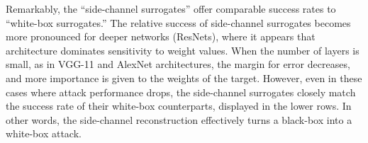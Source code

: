 \documentclass[12pt]{report}
\begin{document}
Remarkably, the ``side-channel surrogates'' offer comparable
success rates to
``white-box surrogates.'' 
The relative success of side-channel surrogates becomes more pronounced for deeper networks (ResNets), where it appears that architecture dominates sensitivity to weight values.
When the number of layers is small, as in VGG-11 and AlexNet architectures, 
the margin for error decreases, 
and more importance is given to the weights of the target. 
However, even in these cases where attack performance drops, 
the side-channel surrogates closely match the success rate 
of their white-box counterparts, 
displayed in the lower rows. 
In other words, the side-channel reconstruction effectively 
turns a black-box into a white-box attack.


\begin{table}[t]
\centering
\vspace{-1mm}
\caption{Transfer attack results on CIFAR-10.\label{tab:cifar}}
\vspace{-2mm}
\end{table}
\end{document}
